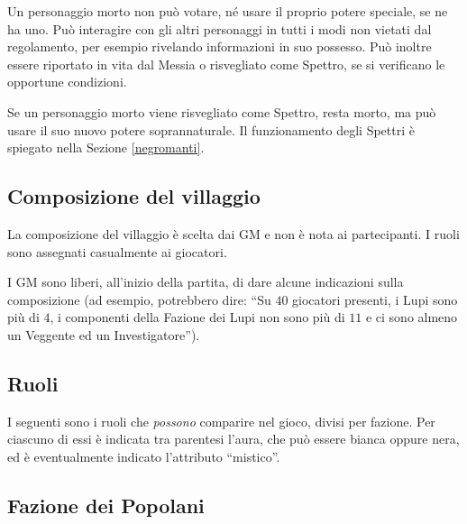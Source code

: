 \documentclass[a4paper,10pt]{article}
\begin{document}
Un personaggio morto non può votare, né usare il proprio potere speciale, se ne
ha uno. Può interagire con gli altri personaggi in tutti i modi non vietati dal
regolamento, per esempio rivelando informazioni in suo possesso. Può inoltre
essere riportato in vita dal Messia o risvegliato come Spettro, se si verificano
le opportune condizioni.

Se un personaggio morto viene risvegliato come Spettro, resta morto, ma può
usare il suo nuovo potere soprannaturale. Il funzionamento degli Spettri è
spiegato nella Sezione \ref{negromanti}.


\subsection{Composizione del villaggio}
 
La composizione del villaggio è scelta dai GM e non è nota ai partecipanti. I
ruoli sono assegnati casualmente ai giocatori.

I GM sono liberi, all'inizio della partita, di dare alcune indicazioni sulla
composizione (ad esempio, potrebbero dire: ``Su $40$ giocatori presenti, i Lupi
sono più di $4$, i componenti della Fazione dei Lupi non sono più di $11$ e ci
sono almeno un Veggente ed un Investigatore'').


\subsection{Ruoli}
\label{ruoli}


I seguenti sono i ruoli che \emph{possono} comparire nel gioco, divisi per
fazione.
Per ciascuno di essi è indicata tra parentesi l'aura, che può essere bianca
oppure nera, ed è eventualmente indicato l'attributo ``mistico''.


\subsection*{Fazione dei Popolani}
\end{document}
